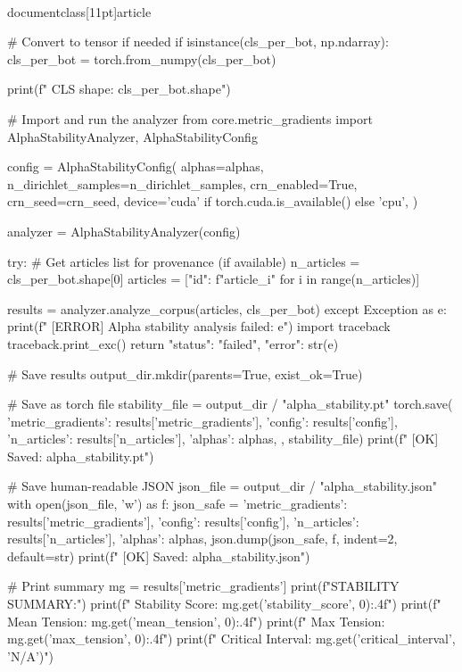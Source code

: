 \\documentclass[11pt]{article}
\begin{document}
\begin{CodeBlock}
    # Convert to tensor if needed
    if isinstance(cls_per_bot, np.ndarray):
        cls_per_bot = torch.from_numpy(cls_per_bot)

    print(f"  CLS shape: {cls_per_bot.shape}")

    # Import and run the analyzer
    from core.metric_gradients import AlphaStabilityAnalyzer, AlphaStabilityConfig

    config = AlphaStabilityConfig(
        alphas=alphas,
        n_dirichlet_samples=n_dirichlet_samples,
        crn_enabled=True,
        crn_seed=crn_seed,
        device='cuda' if torch.cuda.is_available() else 'cpu',
    )

    analyzer = AlphaStabilityAnalyzer(config)

    try:
        # Get articles list for provenance (if available)
        n_articles = cls_per_bot.shape[0]
        articles = [{"id": f"article_{i}"} for i in range(n_articles)]

        results = analyzer.analyze_corpus(articles, cls_per_bot)
    except Exception as e:
        print(f"  [ERROR] Alpha stability analysis failed: {e}")
        import traceback
        traceback.print_exc()
        return {"status": "failed", "error": str(e)}

    # Save results
    output_dir.mkdir(parents=True, exist_ok=True)

    # Save as torch file
    stability_file = output_dir / "alpha_stability.pt"
    torch.save({
        'metric_gradients': results['metric_gradients'],
        'config': results['config'],
        'n_articles': results['n_articles'],
        'alphas': alphas,
    }, stability_file)
    print(f"  [OK] Saved: alpha_stability.pt")

    # Save human-readable JSON
    json_file = output_dir / "alpha_stability.json"
    with open(json_file, 'w') as f:
        json_safe = {
            'metric_gradients': results['metric_gradients'],
            'config': results['config'],
            'n_articles': results['n_articles'],
            'alphas': alphas,
        }
        json.dump(json_safe, f, indent=2, default=str)
    print(f"  [OK] Saved: alpha_stability.json")

    # Print summary
    mg = results['metric_gradients']
    print(f"\n  STABILITY SUMMARY:")
    print(f"    Stability Score: {mg.get('stability_score', 0):.4f}")
    print(f"    Mean Tension: {mg.get('mean_tension', 0):.4f}")
    print(f"    Max Tension: {mg.get('max_tension', 0):.4f}")
    print(f"    Critical Interval: {mg.get('critical_interval', 'N/A')}")


\end{CodeBlock}
\end{document}
